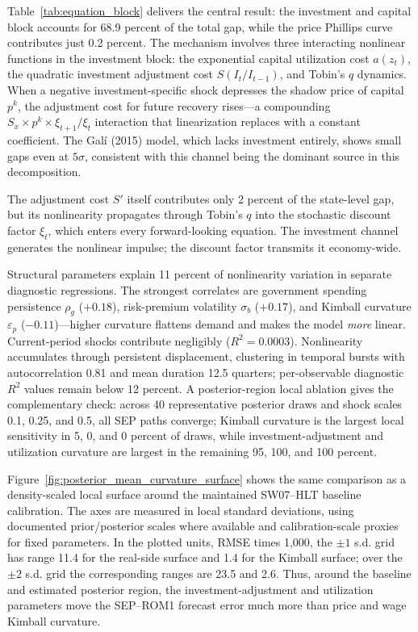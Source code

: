 \documentclass[12pt]{article}
\theoremstyle{plain}
\theoremstyle{definition}
\theoremstyle{remark}
\begin{document}
Table~\ref{tab:equation_block} delivers the central result: the investment and capital block accounts for 68.9 percent of the total gap, while the price Phillips curve contributes just 0.2 percent. The mechanism involves three interacting nonlinear functions in the investment block: the exponential capital utilization cost $a(z_t)$, the quadratic investment adjustment cost $S(I_t/I_{t-1})$, and Tobin's $q$ dynamics. When a negative investment-specific shock depresses the shadow price of capital $p^k$, the adjustment cost for future recovery rises---a compounding $S_x \times p^k \times \xi_{t+1}/\xi_t$ interaction that linearization replaces with a constant coefficient. The Gal\'i (2015) model, which lacks investment entirely, shows small gaps even at $5\sigma$, consistent with this channel being the dominant source in this decomposition.

The adjustment cost $S'$ itself contributes only 2 percent of the state-level gap, but its nonlinearity propagates through Tobin's $q$ into the stochastic discount factor $\xi_t$, which enters every forward-looking equation. The investment channel generates the nonlinear impulse; the discount factor transmits it economy-wide.

Structural parameters explain 11 percent of nonlinearity variation in separate diagnostic regressions. The strongest correlates are government spending persistence $\rho_g$ ($+0.18$), risk-premium volatility $\sigma_b$ ($+0.17$), and Kimball curvature $\varepsilon_p$ ($-0.11$)---higher curvature flattens demand and makes the model \emph{more} linear. Current-period shocks contribute negligibly ($R^2 = 0.0003$). Nonlinearity accumulates through persistent displacement, clustering in temporal bursts with autocorrelation 0.81 and mean duration 12.5 quarters; per-observable diagnostic $R^2$ values remain below 12 percent. A posterior-region local ablation gives the complementary check: across 40 representative posterior draws and shock scales 0.1, 0.25, and 0.5, all SEP paths converge; Kimball curvature is the largest local sensitivity in 5, 0, and 0 percent of draws, while investment-adjustment and utilization curvature are largest in the remaining 95, 100, and 100 percent.

Figure~\ref{fig:posterior_mean_curvature_surface} shows the same comparison as a density-scaled local surface around the maintained SW07--HLT baseline calibration. The axes are measured in local standard deviations, using documented prior/posterior scales where available and calibration-scale proxies for fixed parameters. In the plotted units, RMSE times 1,000, the $\pm 1$ s.d. grid has range 11.4 for the real-side surface and 1.4 for the Kimball surface; over the $\pm 2$ s.d. grid the corresponding ranges are 23.5 and 2.6. Thus, around the baseline and estimated posterior region, the investment-adjustment and utilization parameters move the SEP--ROM1 forecast error much more than price and wage Kimball curvature.
\end{document}
